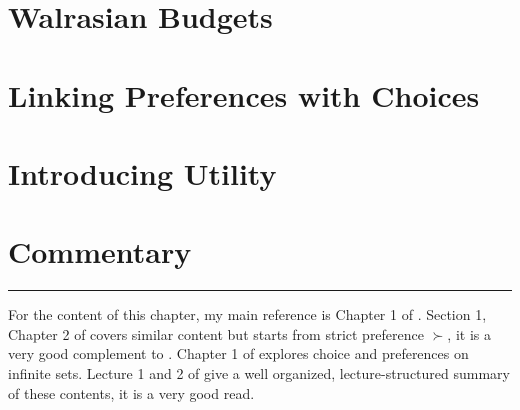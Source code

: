 \section{Walrasian Budgets}\label{chap2:sec2}


\section{Linking Preferences with Choices}\label{chap2:sec3}
%

\section{Introducing Utility}\label{chap2:sec4}
%

\section{Commentary}\label{chap2:sec5}
%

\vspace{0.5cm}
\noindent\rule{\textwidth}{0.4pt}

For the content of this chapter, my main reference is Chapter 1 of \citet{mas1995microeconomic}. Section 1, Chapter 2 of \citet{kreps1990acourse} covers similar content but starts from strict preference $\succ$, it is a very
good complement to \citet{mas1995microeconomic}. Chapter 1 of \citet{kreps2013microeconomic} explores choice and preferences on infinite sets. Lecture 1 and 2 of \citet{ariel2012lecture} give a well organized, lecture-structured summary of
these contents, it is a very good read.
